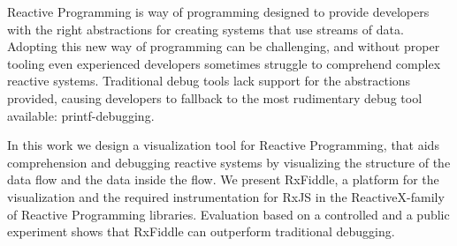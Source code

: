 Reactive Programming is way of programming designed to provide developers with the right abstractions for creating systems that use streams of data.
Adopting this new way of programming can be challenging, and without proper tooling even experienced developers sometimes struggle to comprehend complex reactive systems.
Traditional debug tools lack support for the abstractions provided, causing developers to fallback to the most rudimentary debug tool available: printf-debugging.

In this work we design a visualization tool for Reactive Programming, that aids comprehension and debugging reactive systems by visualizing the structure of the data flow and the data inside the flow.
We present RxFiddle, a platform for the visualization and the required instrumentation for RxJS in the ReactiveX-family of Reactive Programming libraries.
Evaluation based on a controlled and a public experiment shows that RxFiddle can outperform traditional debugging.
